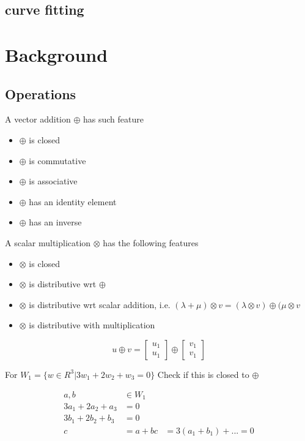 		\section{curve fitting}
			
	\chapter{Background}
		\section{Operations}
			A vector addition $\oplus$ has such feature
			\begin{itemize}
				\item $\oplus$ is closed
				\item $\oplus$ is commutative
				\item $\oplus$ is associative
				\item $\oplus$ has an identity element
				\item $\oplus$ has an inverse
			\end{itemize}

			A scalar multiplication $\otimes$ has the following features
			\begin{itemize}
				\item $\otimes$ is closed
				\item $\otimes$ is distributive wrt $\oplus$
				\item $\otimes$ is distributive wrt scalar addition, i.e. $(\lambda + \mu) \otimes v = (\lambda \otimes v) \oplus (\mu \otimes v$
				\item $\otimes$ is distributive with multiplication
			\end{itemize}

			\begin{equation}
				u \oplus v = \left[\begin{align}u_1 \\ u_1\end{align}\right] \oplus \left[\begin{align}v_1 \\ v_1\end{align}\right]
			\end{equation}

			For $W_1 = \{w \in R^3 | 3w_1 + 2w_2 + w_3 = 0\}$
			Check if this is closed to $\oplus$

			\begin{align}
				a, b &\in W_1 \\
				3a_1 + 2a_2 + a_3 & = 0\\
				3b_1 + 2b_2 + b_3 & = 0\\
				c & = a + b
				c & = 3 (a_1 + b_1) + ... = 0
			\end{align}

